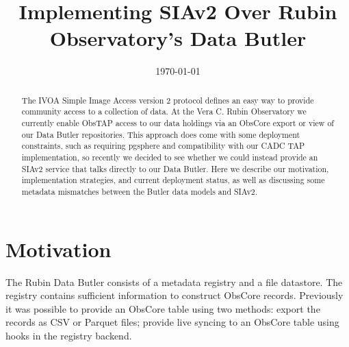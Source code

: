 \documentclass[11pt,twoside]{article}
\begin{document}

\date{\today}
\title{Implementing SIAv2 Over Rubin Observatory's Data Butler}



\begin{abstract}
The IVOA Simple Image Access version 2 protocol defines an easy way to provide community access to a collection of data. At the Vera C. Rubin Observatory we currently enable ObsTAP access to our data holdings via an ObsCore export or view of our Data Butler repositories. This approach does come with some deployment constraints, such as requiring pgsphere and compatibility with our CADC TAP implementation, so recently we decided to see whether we could instead provide an SIAv2 service that talks directly to our Data Butler. Here we describe our motivation, implementation strategies, and current deployment status, as well as discussing some metadata mismatches between the Butler data models and SIAv2.
\end{abstract}



\section{Motivation}

The Rubin Data Butler \citep{2022SPIE12189E..11J} consists of a metadata registry and a file datastore.
The registry contains sufficient information to construct ObsCore records.
Previously it was possible to provide an ObsCore table using two methods: export the records as CSV or Parquet files; provide live syncing to an ObsCore table using hooks in the registry backend.
\end{document}
